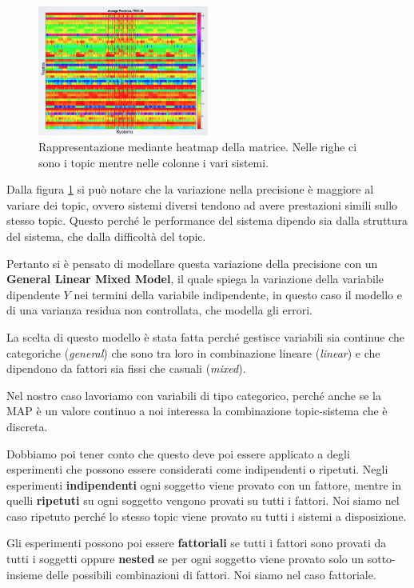 \begin{figure}[htbp]
	\centering
	\includegraphics[width=0.5\textwidth]{images/l20-fig-3}
	\caption{Rappresentazione mediante heatmap della matrice. Nelle righe ci sono i topic mentre nelle colonne i vari sistemi.}\label{fig:heatmap}
\end{figure} 

Dalla figura \ref{fig:heatmap} si può notare che la variazione nella precisione è maggiore al variare dei topic, ovvero sistemi diversi tendono ad avere prestazioni simili sullo stesso topic.
Questo perché le performance del sistema dipendo sia dalla struttura del sistema, che dalla difficoltà del topic.

Pertanto si è pensato di modellare questa variazione della precisione con un \textbf{General Linear Mixed Model}, il quale spiega la variazione della variabile dipendente $Y$ nei termini della variabile indipendente, in questo caso il modello e di una varianza residua non controllata, che modella gli errori.

La scelta di questo modello è stata fatta perché gestisce variabili sia continue che categoriche (\textit{general}) che sono tra loro in combinazione lineare (\textit{linear}) e che dipendono da fattori sia fissi che casuali (\textit{mixed}).

Nel nostro caso lavoriamo con variabili di tipo categorico, perché anche se la MAP è un valore continuo a noi interessa la combinazione topic-sistema che è discreta.

Dobbiamo poi tener conto che questo deve poi essere applicato a degli esperimenti che possono essere considerati come indipendenti o ripetuti. Negli esperimenti \textbf{indipendenti} ogni soggetto viene provato con un fattore, mentre in quelli \textbf{ripetuti} su ogni soggetto vengono provati su tutti i fattori. Noi siamo nel caso ripetuto perché lo stesso topic viene provato su tutti i sistemi a disposizione.

Gli esperimenti possono poi essere \textbf{fattoriali} se tutti i fattori sono provati da tutti i soggetti oppure \textbf{nested} se per ogni soggetto viene provato solo un sotto-insieme delle possibili combinazioni di fattori. Noi siamo nel caso fattoriale.

